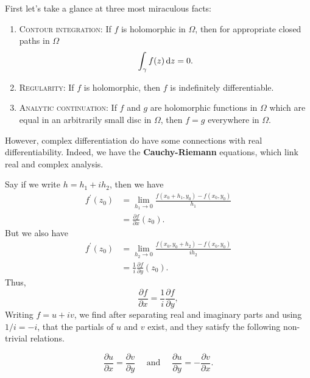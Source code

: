 \documentclass{chapter}
\begin{document}
            \bigskip
            First let's take a glance at three most miraculous facts:

            \begin{enumerate}
                \item \textsc{Contour integration}: If $f$ is holomorphic in $\Omega$, then for appropriate closed paths in $\Omega$ \[\int_{\gamma} f(z) \mathop{}\!\mathrm{d} z=0.\]
                \item \textsc{Regularity}: If $f$ is holomorphic, then $f$ is indefinitely differentiable.
                \item \textsc{Analytic continuation}: If $f$ and $g$ are holomorphic functions in $\Omega$ which are equal in an arbitrarily small disc in $\Omega$, then $f = g$ everywhere in $\Omega$.
            \end{enumerate}
            
            However, complex differentiation do have some connections with real differentiability. Indeed, we have the \textbf{Cauchy-Riemann} equations, which link real and complex analysis. 
        
            Say if we write $h=h_{1}+i h_{2}$, then we have \[\begin{aligned} f^{\prime}\left(z_{0}\right) &=\lim _{h_{1} \rightarrow 0} \frac{f\left(x_{0}+h_{1}, y_{0}\right)-f\left(x_{0}, y_{0}\right)}{h_{1}} \\ &=\frac{\partial f}{\partial x}\left(z_{0}\right). \end{aligned}\] 
            But we also have \[\begin{aligned} f^{\prime}\left(z_{0}\right) &=\lim _{h_{2} \rightarrow 0} \frac{f\left(x_{0}, y_{0}+h_{2}\right)-f\left(x_{0}, y_{0}\right)}{i h_{2}} \\ &=\frac{1}{i} \frac{\partial f}{\partial y}\left(z_{0}\right). \end{aligned}\]
            Thus, \[\frac{\partial f}{\partial x}=\frac{1}{i} \frac{\partial f}{\partial y},\]
            Writing $f = u + iv$, we find after separating real and imaginary parts and using $1/i = -i$, that the partials of $u$ and $v$ exist, and they satisfy the following non-trivial relations.
            
            \begin{theorem}
                \[\frac{\partial u}{\partial x}=\frac{\partial v}{\partial y} \quad \text { and } \quad \frac{\partial u}{\partial y}=-\frac{\partial v}{\partial x}.\]
            \end{theorem}
\end{document}
